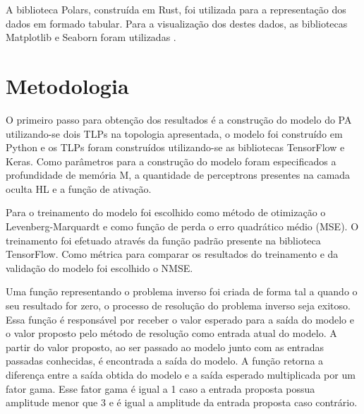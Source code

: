 A biblioteca Polars, construída em Rust, foi utilizada para a representação dos dados em formado tabular. Para a visualização dos destes dados, as bibliotecas Matplotlib e Seaborn foram utilizadas \cite{Hunter:2007} \cite{Waskom2021}.

\section{Metodologia} \label{sec:estudoi-meto}
O primeiro passo para obtenção dos resultados é a construção do modelo do PA utilizando-se dois TLPs na topologia apresentada, o modelo foi construído em Python e os TLPs foram construídos utilizando-se as bibliotecas TensorFlow e Keras. Como parâmetros para a construção do modelo foram especificados a profundidade de memória M, a quantidade de perceptrons presentes na camada oculta HL e a função de ativação.

Para o treinamento do modelo foi escolhido como método de otimização o Levenberg-Marquardt e como função de perda o erro quadrático médio (MSE). O treinamento foi efetuado através da função padrão presente na biblioteca TensorFlow. Como métrica para comparar os resultados do treinamento e da validação do modelo foi escolhido o NMSE.

Uma função representando o problema inverso foi criada de forma tal a quando o seu resultado for zero, o processo de resolução do problema inverso seja exitoso. Essa função é responsável por receber o valor esperado para a saída do modelo e o valor proposto pelo método de resolução como entrada atual do modelo. A partir do valor proposto, ao ser passado ao modelo junto com as entradas passadas conhecidas, é encontrada a saída do modelo. A função retorna a diferença entre a saída obtida do modelo e a saída esperado multiplicada por um fator gama. Esse fator gama é igual a 1 caso a entrada proposta possua amplitude menor que 3 e é igual a amplitude da entrada proposta caso contrário.


